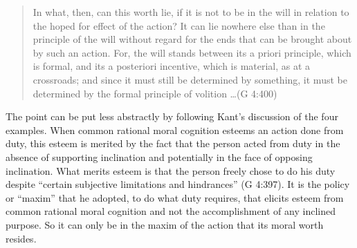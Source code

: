 \begin{quote}
	In what, then, can this worth lie, if it is not to be in the will in relation to the hoped for effect of the action? It can lie nowhere else than in the principle of the will without regard for the ends that can be brought about by such an action. For, the will stands between its a priori principle, which is formal, and its a posteriori incentive, which is material, as at a crossroads; and since it must still be determined by something, it must be determined by the formal principle of volition \ldots (G 4:400)
\end{quote}

The point can be put less abstractly by following Kant's discussion of the four examples. When common rational moral cognition esteems an action done from duty, this esteem is merited by the fact that the person acted from duty in the absence of supporting inclination and potentially in the face of opposing inclination. What merits esteem is that the person freely chose to do his duty despite ``certain subjective limitations and hindrances'' (G 4:397). It is the policy or ``maxim'' that he adopted, to do what duty requires, that elicits esteem from common rational moral cognition and not the accomplishment of any inclined purpose. So it can only be in the maxim of the action that its moral worth resides. \change

% 

